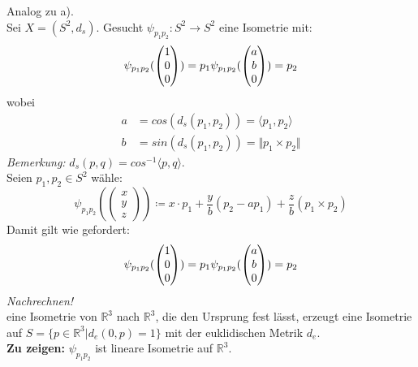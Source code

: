 \begin{problem*}[1b]
Analog zu a).\\
Sei $ X = (S^2, d_s) $. Gesucht $ \psi_{ p_1p_2 }: S^2 \to S^2$ eine Isometrie mit:
\begin{equation}
	\psi_{ p_1p_2 }(\begin{pmatrix}1 \\ 0 \\ 0\end{pmatrix}) = p_1 \\
	\psi_{ p_1p_2 }(\begin{pmatrix}a \\ b \\ 0\end{pmatrix}) = p_2
\end{equation}	
wobei 
\begin{align*}
a &= cos(d_s(p_1,p_2)) = \langle p_1, p_2 \rangle \\
b &= sin (d_s(p_1,p_2)) = \Vert p_1 \times p_2 \Vert
\end{align*}
\emph{Bemerkung:} $d_s(p,q) = cos^{ -1 } \langle p,q \rangle$.\\
Seien $ p_1, p_2 \in S^2 $ wähle:
\begin{equation*}
	\psi_{ p_1p_2 }(\begin{pmatrix}x \\ y \\ z\end{pmatrix}) \coloneqq x \cdot p_1 + 
	\frac{y}{b} (p_2-ap_1) + \frac{z}{b}(p_1 \times p_2)
\end{equation*}
Damit gilt wie gefordert: 
\begin{equation*}
	\psi_{ p_1p_2 }(\begin{pmatrix}1\\ 0 \\ 0\end{pmatrix}) = p_1 \\
	\psi_{ p_1p_2 }(\begin{pmatrix}a \\ b \\ 0\end{pmatrix}) = p_2
\end{equation*}
\emph{Nachrechnen!}\\
eine Isometrie von $\mathbb{R}^3$ nach $\mathbb{R}^3$, die den Ursprung fest lässt, erzeugt eine Isometrie auf $S = \{ p \in \mathbb{R}^3 | d_e(0,p) = 1 \}$ mit der euklidischen Metrik $ d_e $.\\
\textbf{Zu zeigen:} $\psi_{ p_1p_2 }$ ist lineare Isometrie auf $\mathbb{R}^3$.\\

\end{problem*}
